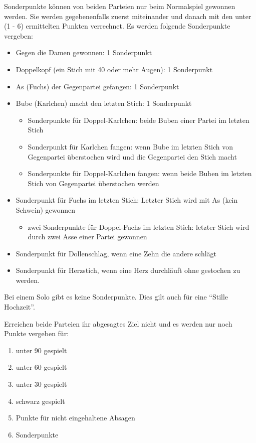 \documentclass{scrartcl}
\begin{document}
Sonderpunkte können von beiden Parteien nur beim Normalspiel gewonnen werden.  Sie werden gegebenenfalls zuerst miteinander und danach mit den unter (1 - 6) ermittelten Punkten verrechnet.  Es werden folgende Sonderpunkte vergeben:
\begin{itemize}
  \item Gegen die \kreuz Damen gewonnen: 1 Sonderpunkt
  \item Doppelkopf (ein Stich mit 40 oder mehr Augen): 1 Sonderpunkt
  \item \karo As (Fuchs) der Gegenpartei gefangen: 1 Sonderpunkt
  \item \optional \kreuz Bube (Karlchen) macht den letzten Stich: 1 Sonderpunkt
    \begin{itemize}
      \item {} Sonderpunkte für Doppel-Karlchen: beide \kreuz Buben einer Partei im letzten Stich
      \item {} Sonderpunkt für Karlchen fangen: wenn \kreuz Bube im letzten Stich von Gegenpartei überstochen wird und
	die Gegenpartei den Stich macht
      \item {} Sonderpunkte für Doppel-Karlchen fangen: wenn beide \kreuz Buben im letzten Stich von Gegenpartei überstochen werden
    \end{itemize}
  \item {} Sonderpunkt für Fuchs im letzten Stich: Letzter Stich wird mit \karo As (kein Schwein) gewonnen
    \begin{itemize}
      \item \optional zwei Sonderpunkte für Doppel-Fuchs im letzten Stich: letzter Stich wird durch zwei \karo Asse einer Partei gewonnen
    \end{itemize}
  \item {} Sonderpunkt für Dollenschlag, wenn eine \herz Zehn die andere schlägt
  \item {} Sonderpunkt für Herzstich, wenn eine Herz
    durchläuft ohne gestochen zu werden.
\end{itemize}

Bei einem Solo gibt es keine Sonderpunkte. Dies gilt auch für eine "`Stille Hochzeit"'.

Erreichen beide Parteien ihr abgesagtes Ziel nicht und es werden nur noch Punkte vergeben für:
\begin{enumerate}
  \item unter 90 gespielt
  \item unter 60 gespielt
  \item unter 30 gespielt
  \item schwarz gespielt
  \item Punkte für nicht eingehaltene Absagen
  \item Sonderpunkte
\end{enumerate}
\end{document}
